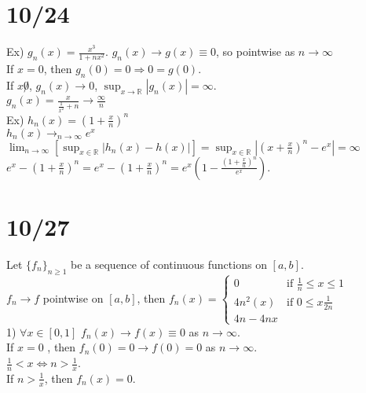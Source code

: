 \documentclass[11pt]{article}
\begin{document}
\section*{10/24}
	Ex) $g_n(x) = \frac{x^3}{1 + nx^2}$. $g_n(x) \to g(x) \equiv 0$, so
	pointwise as $n \to \infty$\\
	If $x = 0$, then $g_n(0) = 0 \Rightarrow 0 = g(0)$.\\
	If $x \not 0$, $g_n(x) \to 0$, $\sup_{x \to \mathbb{R}}|g_n(x)| = \infty$.\\
	$g_n(x) = \frac{x}{\frac{1}{x^2} + n} \rightarrow \frac{\infty}{n}$\\
	Ex) $h_n(x) = (1 + \frac{x}{n})^n$\\
	$h_n(x) \rightarrow_{n \to \infty} e^x$\\
	$\lim_{n \to \infty}[\sup_{x \in \mathbb{R}} |h_n(x) - h(x)|] = 
	\sup_{x \in \mathbb{R}}|(x + \frac{x}{n})^n - e^x| = \infty$\\
	$e^x - (1 + \frac{x}{n})^n = e^x - (1 + \frac{x}{n})^n = e^x(1 - 
	\frac{(1+\frac{x}{n})^n}{e^x})$.\\

\section*{10/27}
	Let $\{f_n\}_{n \ge 1}$ be a sequence of continuous functions on $[a,b]$.\\
	$f_n \to f$ pointwise on $[a,b]$, then $f_n(x) = \begin{cases} 0 & \text{if
	$\frac{1}{n} \le x \le 1$}\\ 4n^2(x) & \text{if } 0 \le x \frac{1}{2n} \\
	4n - 4nx & \end{cases}$\\
	1) $\forall x \in [0, 1]$ $f_n(x) \to f(x) \equiv 0$ as $n \to \infty$.\\
	If $x = 0$ , then $f_n(0) = 0 \to f(0) = 0$ as $n \to \infty$.\\
	$\frac{1}{n} < x \Leftrightarrow n > \frac{1}{x}$.\\
	If $n > \frac{1}{x}$, then $f_n(x) = 0$.\\
\end{document}
